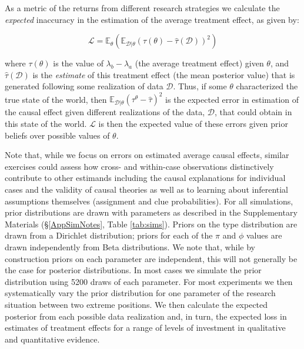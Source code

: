 \documentclass[12pt,]{book}
\begin{document}
As a metric of the returns from different research strategies we calculate the \emph{expected} inaccuracy in the estimation of the average treatment effect, as given by:

\[\mathcal{L}=\mathbb{E}_\theta(\mathbb{E}_{\mathcal{D}|\theta}(\tau(\theta)-\hat{\tau}(\mathcal{D}))^2) \]

where \(\tau(\theta)\) is the value of \(\lambda_b-\lambda_a\) (the average treatment effect) given \(\theta\), and \(\hat{\tau}(\mathcal{D})\) is the \emph{estimate} of this treatment effect (the mean posterior value) that is generated following some realization of data \(\mathcal{D}\). Thus, if some \(\theta\) characterized the true state of the world, then \(\mathbb{E}_{\mathcal{D}|\theta}(\tau^\theta-\hat{\tau})^2\) is the expected error in estimation of the causal effect given different realizations of the data, \(\mathcal{D}\), that could obtain in this state of the world. \(\mathcal{L}\) is then the expected value of these errors given prior beliefs over possible values of \(\theta\).

Note that, while we focus on errors on estimated average causal effects, similar exercises could assess how cross- and within-case observations distinctively contribute to other estimands \textbar{} including the causal explanations for individual cases and the validity of causal theories \textbar{} as well as to learning about inferential assumptions themselves (assignment and clue probabilities).
For all simulations, prior distributions are drawn with parameters as described in the Supplementary Materials (\S \ref{AppSimNotes}, Table \ref{tab:sims}). Priors on the type distribution are drawn from a Dirichlet distribution; priors for each of the \(\pi\) and \(\phi\) values are drawn independently from Beta distributions. We note that, while by construction priors on each parameter are independent, this will not generally be the case for posterior distributions. In most cases we simulate the prior distribution using 5200 draws of each parameter. For most experiments we then systematically vary the prior distribution for one parameter of the research situation between two extreme positions. We then calculate the expected posterior from each possible data realization and, in turn, the expected loss in estimates of treatment effects for a range of levels of investment in qualitative and quantitative evidence.
\end{document}
